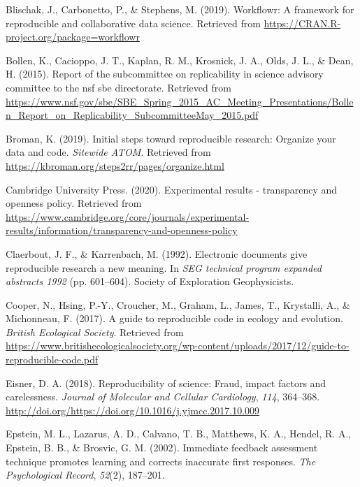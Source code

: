 \documentclass[12pt,twoside]{reedthesis}
\begin{document}
\leavevmode\hypertarget{ref-R-workflowr}{}%
Blischak, J., Carbonetto, P., \& Stephens, M. (2019). Workflowr: A framework for reproducible and collaborative data science. Retrieved from \url{https://CRAN.R-project.org/package=workflowr}

\leavevmode\hypertarget{ref-arlington}{}%
Bollen, K., Cacioppo, J. T., Kaplan, R. M., Krosnick, J. A., Olds, J. L., \& Dean, H. (2015). Report of the subcommittee on replicability in science advisory committee to the nsf sbe directorate. Retrieved from \url{https://www.nsf.gov/sbe/SBE_Spring_2015_AC_Meeting_Presentations/Bollen_Report_on_Replicability_SubcommitteeMay_2015.pdf}

\leavevmode\hypertarget{ref-broman}{}%
Broman, K. (2019). Initial steps toward reproducible research: Organize your data and code. \emph{Sitewide ATOM}. Retrieved from \url{https://kbroman.org/steps2rr/pages/organize.html}

\leavevmode\hypertarget{ref-exp-results}{}%
Cambridge University Press. (2020). Experimental results - transparency and openness policy. Retrieved from \url{https://www.cambridge.org/core/journals/experimental-results/information/transparency-and-openness-policy}

\leavevmode\hypertarget{ref-claerbout}{}%
Claerbout, J. F., \& Karrenbach, M. (1992). Electronic documents give reproducible research a new meaning. In \emph{SEG technical program expanded abstracts 1992} (pp. 601--604). Society of Exploration Geophysicists.

\leavevmode\hypertarget{ref-cooper2017guide}{}%
Cooper, N., Hsing, P.-Y., Croucher, M., Graham, L., James, T., Krystalli, A., \& Michonneau, F. (2017). A guide to reproducible code in ecology and evolution. \emph{British Ecological Society}. Retrieved from \url{https://www.britishecologicalsociety.org/wp-content/uploads/2017/12/guide-to-reproducible-code.pdf}

\leavevmode\hypertarget{ref-eisner-reproducibility}{}%
Eisner, D. A. (2018). Reproducibility of science: Fraud, impact factors and carelessness. \emph{Journal of Molecular and Cellular Cardiology}, \emph{114}, 364--368. \url{http://doi.org/https://doi.org/10.1016/j.yjmcc.2017.10.009}

\leavevmode\hypertarget{ref-epstein2002immediate}{}%
Epstein, M. L., Lazarus, A. D., Calvano, T. B., Matthews, K. A., Hendel, R. A., Epstein, B. B., \& Brosvic, G. M. (2002). Immediate feedback assessment technique promotes learning and corrects inaccurate first responses. \emph{The Psychological Record}, \emph{52}(2), 187--201.
\end{document}
